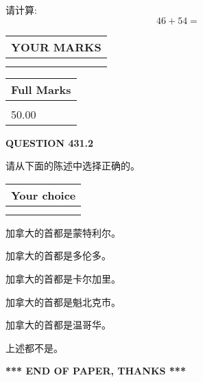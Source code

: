 \documentclass{ctexart}
\begin{document}
  
 
请计算:
\begin{equation}
46 +  %
54 = \nonumber
\end{equation}
 

 

 
  
\vspace{0.2in}
  
\noindent\begin{tabular}{|l|}
\hline
 YOUR MARKS  \\
\hline
 \\ 
 \\ 
\hline
\end{tabular}
\hspace{0.05in} \begin{tabular}{|l|}
\hline
 Full Marks  \\
\hline
 \\ 
50.00 \\
\hline
\end{tabular}
{\textbf{\Large{QUESTION
431.2 
}}}
  
  
请从下面的陈述中选择正确的。
  
  
\noindent\hspace{3.0in} \begin{tabular}{|l|}
\hline
Your choice \\
\hline
 \\ 
 \\ 
\hline
\end{tabular}
  
  
 
 
加拿大的首都是蒙特利尔。
 
 
加拿大的首都是多伦多。
 
 
加拿大的首都是卡尔加里。
 
 
加拿大的首都是魁北克市。
 
 
加拿大的首都是温哥华。
 
 
 上述都不是。
 
 
   
   
 \vspace{0.2in}
 
   
   
   
   
\vspace{1.0in} 
{\textbf{\large{ *** END OF PAPER, THANKS *** }}} 
   
\end{document}
